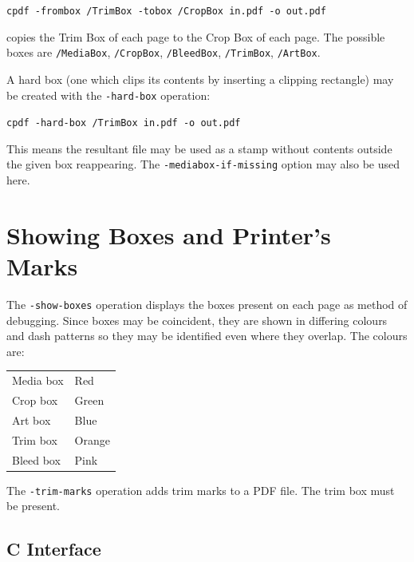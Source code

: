 \documentclass{book}
\begin{document}
  \begin{framed}
    \noindent\small\verb!cpdf -frombox /TrimBox -tobox /CropBox in.pdf -o out.pdf!
  \end{framed}
  \noindent copies the Trim Box of each page to the Crop Box of each page. The possible boxes are \texttt{/MediaBox}, \texttt{/CropBox}, \texttt{/BleedBox}, \texttt{/TrimBox}, \texttt{/ArtBox}.\pagestyle{empty}\thispagestyle{fancy}

A hard box (one which clips its contents by inserting a clipping rectangle) may be created with the \texttt{-hard-box} operation:

  \begin{framed}
    \noindent\small\verb!cpdf -hard-box /TrimBox in.pdf -o out.pdf!
  \end{framed}

\noindent This means the resultant file may be used as a stamp without contents outside the given box reappearing. The \texttt{-mediabox-if-missing} option may also be used here.

\section{Showing Boxes and Printer's Marks}

The \texttt{-show-boxes} operation displays the boxes present on each page as method of debugging. Since boxes may be coincident, they are shown in differing colours and dash patterns so they may be identified even where they overlap. The colours are:

\medskip
\begin{tabular}{ll}
Media box & Red \\
Crop box & Green \\
Art box & Blue \\
Trim box & Orange \\
Bleed box & Pink 
\end{tabular}
\medskip

\noindent  The \texttt{-trim-marks} operation adds trim marks to a PDF file. The trim box must be present.

\begin{cpdflib}
\clearpage
\section*{C Interface}
\begin{small}\tt

\end{small}
\end{cpdflib}
\end{document}
